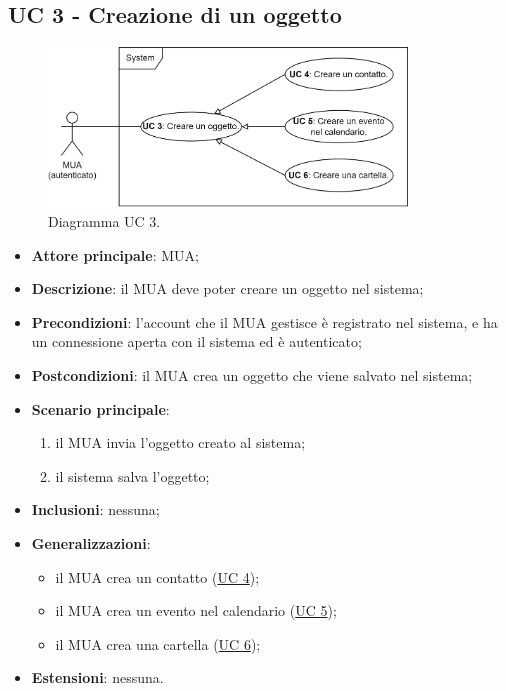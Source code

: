 \subsection{UC 3 - Creazione di un oggetto} \label{sec:UC3}
    \begin{figure}[h]
        \includegraphics[width=0.85\textwidth]{sections/uc_imgs/UC03.png}
        \centering
        \caption{Diagramma UC 3.}
    \end{figure}
    \begin{itemize}
        \item \textbf{Attore principale}: MUA;
        \item \textbf{Descrizione}: il MUA deve poter creare un oggetto nel sistema;
        \item \textbf{Precondizioni}: l’account che il MUA gestisce è registrato nel sistema, e ha un connessione aperta con il sistema ed è autenticato;
        \item \textbf{Postcondizioni}: il MUA crea un oggetto che viene salvato nel sistema;
        \item \textbf{Scenario principale}:
            \begin{enumerate}
                \item il MUA invia l'oggetto creato al sistema;
                \item il sistema salva l'oggetto;
            \end{enumerate}
        \item \textbf{Inclusioni}: nessuna;
        \item \textbf{Generalizzazioni}:
            \begin{itemize}
                \item il MUA crea un contatto (\hyperref[sec:UC4]{UC 4});
                \item il MUA crea un evento nel calendario (\hyperref[sec:UC5]{UC 5});
                \item il MUA crea una cartella (\hyperref[sec:UC6]{UC 6});
            \end{itemize}
        \item \textbf{Estensioni}: nessuna.
    \end{itemize}

